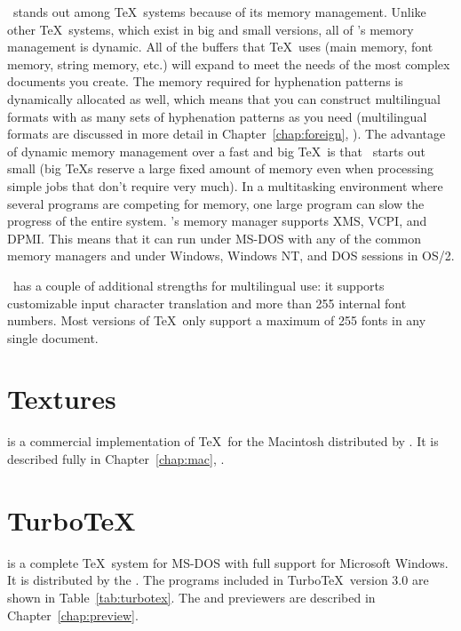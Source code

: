 \yyTeX\ stands out among \TeX\ systems because of its memory management.
Unlike other \TeX\ systems, which exist in big and small versions, all of
\yyTeX's memory management is dynamic.  All of the buffers that \TeX\ uses
(main memory, font memory, string memory, etc.) will expand to meet the needs
of the most complex documents you create.  The memory required for hyphenation
patterns is dynamically allocated as well, which means that you can construct
multilingual formats with as many sets of hyphenation patterns as you need
(multilingual formats are discussed in more detail in
Chapter~\ref{chap:foreign}, \textit{}).  The advantage
of dynamic memory management over a fast and big \TeX\ is that \yyTeX\ starts
out small (big \TeX{}s reserve a large fixed amount of memory even when
processing simple jobs that don't require very much).  In a multitasking
environment where several programs are competing for memory, one large program
can slow the progress of the entire system.  \yyTeX's memory manager supports
XMS, VCPI, and DPMI.
This means that it can run under MS-DOS with any of the common memory managers
and under Windows, Windows NT, and DOS sessions in OS/2.

\yyTeX\ has a couple of additional strengths for multilingual use: it supports
customizable input character translation and more than 255 internal font
numbers. Most versions of \TeX\ only support a maximum of 255 fonts in any
single document.

\section{Textures}

 is a commercial
implementation of \TeX\ for the Macintosh distributed by .
It is described fully in Chapter~\ref{chap:mac}, {\it {}}.

\section{Turbo\protect\TeX}
\label{sec:com:turbo}

 is a complete \TeX\ system for 
MS-DOS with full
support for Microsoft Windows.  It is distributed by the .
The programs included in Turbo\TeX\ version 3.0 are shown in
Table~\ref{tab:turbotex}.
The  and  previewers are described
in Chapter~\ref{chap:preview}.

